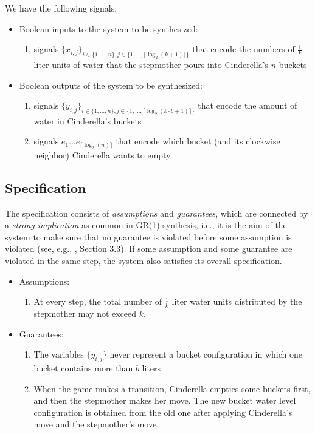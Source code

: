 \documentclass[a4paper,conference,10pt]{IEEEtran}
\begin{document}
\noindent We have the following signals:
\begin{itemize}
\item Boolean inputs to the system to be synthesized:
\begin{enumerate}
\item signals $\{\mathit{x}_{i,j}\}_{i \in \{1, \ldots, n\}, j \in \{1, \ldots, \lceil \log_2(k+1) \rceil \}}$ that encode the numbers of $\frac{1}{k}$ liter units of water that the stepmother pours into Cinderella's $n$ buckets
\end{enumerate}
\item Boolean outputs of the system to be synthesized:
\begin{enumerate}
\item signals $\{\mathit{y}_{i,j}\}_{i \in \{1, \ldots, n\}, j \in \{1, \ldots, \lceil \log_2(k \cdot b+1) \rceil \}}$ that encode the amount of water in Cinderella's  buckets
\item signals $e_1 \ldots e_{\lceil \log_2(n)\rceil}$ that encode which bucket (and its clockwise neighbor) Cinderella wants to empty
\end{enumerate}
\end{itemize}

\subsection{Specification}
\noindent The specification consists of \emph{assumptions} and \emph{guarantees}, which are connected by a \emph{strong implication} as common in GR(1) synthesis, i.e., it is the aim of the system to make sure that no guarantee is violated before some assumption is violated (see, e.g., \cite{DBLP:journals/jcss/BloemJPPS12}, Section 3.3). If some assumption and some guarantee are violated in the same step, the system also satisfies its overall specification.
\begin{itemize}
\item Assumptions:
\begin{enumerate}
\item At every step, the total number of $\frac{1}{k}$ liter water units distributed by the stepmother may not exceed $k$.
\end{enumerate}
\item Guarantees:
\begin{enumerate}
\item The variables $\{\mathit{y}_{i,j}\}$ never represent a bucket configuration in which one bucket contains more than $b$ liters
\item When the game makes a transition, Cinderella empties some buckets first, and then the stepmother makes her move. The new bucket water level configuration is obtained from the old one after applying Cinderella's move and the stepmother's move.
\end{enumerate}
\end{itemize}
\end{document}
